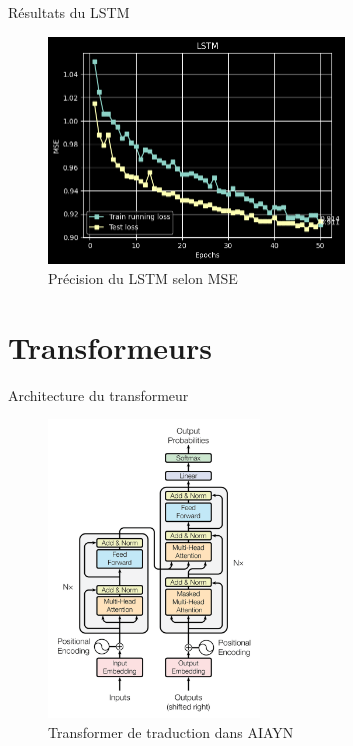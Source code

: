 \documentclass{beamer}
\begin{document}
\begin{frame}{Résultats du LSTM}

\begin{figure} \label{fig:lstm}
    \caption{Précision du LSTM selon MSE} \center
    \includegraphics[width=0.7\textwidth]{images/lstm.png}
\end{figure}

\end{frame}
\section{Transformeurs}

\begin{frame}{Architecture du transformeur}
    \begin{figure} \label{fig:transformer}
        \caption{Transformer de traduction dans AIAYN} \center
        \includegraphics[width=0.5\textwidth]{images/2023-04-04-14-37-09.png}
    \end{figure}
    \end{frame}
\end{document}
